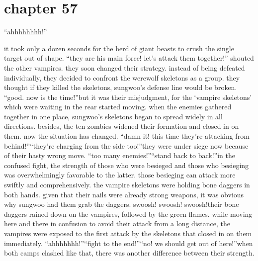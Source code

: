 \section{chapter 57}

                            “ahhhhhhhh!”




it took only a dozen seconds for the herd of giant beasts to crush the single target out of shape.
“they are his main force! let’s attack them together!” shouted the other vampires.
they soon changed their strategy.
 instead of being defeated individually, they decided to confront the werewolf skeletons as a group.
 they thought if they killed the skeletons, sungwoo’s defense line would be broken.
“good.
 now is the time!”but it was their misjudgment, for the ‘vampire skeletons’ which were waiting in the rear started moving.
 when the enemies gathered together in one place, sungwoo’s skeletons began to spread widely in all directions.
 besides, the ten zombies widened their formation and closed in on them.
 now the situation has changed.
“damn it! this time they’re attacking from behind!”“they’re charging from the side too!”they were under siege now because of their hasty wrong move.
“too many enemies!”“stand back to back!”in the confused fight, the strength of those who were besieged and those who besieging was overwhelmingly favorable to the latter.
 those besieging can attack more swiftly and comprehensively.
 the vampire skeletons were holding bone daggers in both hands.
given that their nails were already strong weapons, it was obvious why sungwoo had them grab the daggers.
swoosh! swoosh! swoosh!their bone daggers rained down on the vampires, followed by the green flames.
while moving here and there in confusion to avoid their attack from a long distance, the vampires were exposed to the first attack by the skeletons that closed in on them immediately.
“ahhhhhhh!”“fight to the end!”“no! we should get out of here!”when both camps clashed like that, there was another difference between their strength.

